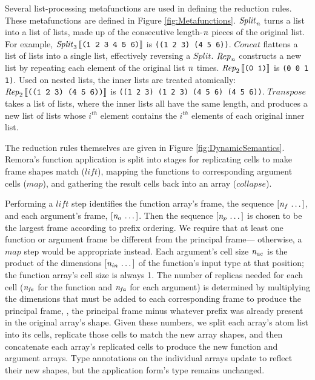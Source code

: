 Several list-processing metafunctions are used in defining the reduction rules.
These metafunctions are defined in Figure \ref{fig:Metafunctions}.
$\mathit{Split}_{\mathit{n}}$ turns a list into a list of lists,
made up of the consecutive length-$\mathit{n}$ pieces of the original list.
For example, $\mathit{Split}_{3}\left\llbracket\text{\tt (1 2 3 4 5 6)}\right\rrbracket$
is {\tt ((1 2 3) (4 5 6))}.
$\mathit{Concat}$ flattens a list of lists into a single list,
effectively reversing a $\mathit{Split}$.
$\mathit{Rep}_{\mathit{n}}$ constructs a new list by
repeating each element of the original list $\mathit{n}$ times.
$\mathit{Rep}_2\left\llbracket\text {\tt (0 1)}\right\rrbracket$
is {\tt (0 0 1 1)}.
Used on nested lists,
the inner lists are treated atomically:
$\mathit{Rep}_2\left\llbracket\text {\tt ((1 2 3) (4 5 6))}\right\rrbracket$
is {\tt ((1 2 3) (1 2 3) (4 5 6) (4 5 6))}.
$\mathit{Transpose}$ takes a list of lists,
where the inner lists all have the same length,
and produces a new list of lists whose $i^{\mathit{th}}$ element
contains the $i^{\mathit{th}}$ elements of each original inner list.

\FigListMetafns

The reduction rules themselves are given in Figure \ref{fig:DynamicSemantics}.
Remora's function application is split into stages for
replicating cells to make frame shapes match ($\mathit{lift}$),
mapping the functions to corresponding argument cells ($\mathit{map}$),
and gathering the result cells back into an array ($\mathit{collapse}$).

Performing a $\mathit{lift}$ step identifies
the function array's frame,
the sequence $[\mathit{n}_f \, \ldots \,]$,
and each argument's frame,
$[\mathit{n}_a \, \ldots \,]$.
Then the sequence $[\mathit{n}_p \, \ldots \,]$ is chosen to be the largest frame
according to prefix ordering.
We require that at least one function or argument frame
be different from the principal frame---%
otherwise, a $\mathit{map}$ step would be appropriate instead.
Each argument's cell size $\mathit{n}_{\mathit{ac}}$ is
the product of the dimensions $[\mathit{n}_{\mathit{in}} \, \ldots \,]$
of the function's input type at that position;
the function array's cell size is always 1.
The number of replicas needed for each cell
($\mathit{n}_{\mathit{fe}}$ for the function and
$\mathit{n}_{\mathit{fa}}$ for each argument)
is determined by multiplying the dimensions
that must be added to each corresponding frame to produce the principal frame,
\ie, the principal frame minus whatever prefix was
already present in the original array's shape.
Given these numbers,
we split each array's atom list into its cells,
replicate those cells to match the new array shapes,
and then concatenate each array's replicated cells
to produce the new function and argument arrays.
Type annotations on the individual arrays update
to reflect their new shapes,
but the application form's type remains unchanged.

